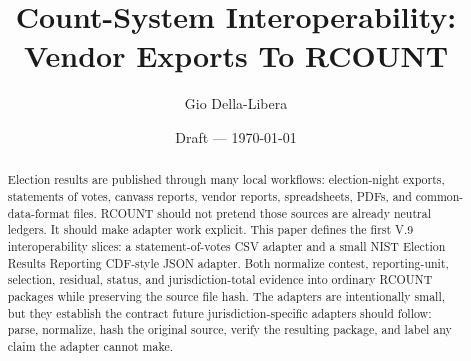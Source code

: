 \documentclass[12pt]{article}
\title{Count-System Interoperability: Vendor Exports To RCOUNT}
\author{Gio Della-Libera}
\date{Draft --- \today}
\begin{document}
\maketitle

\begin{abstract}
Election results are published through many local workflows: election-night
exports, statements of votes, canvass reports, vendor reports, spreadsheets,
PDFs, and common-data-format files. RCOUNT should not pretend those sources are
already neutral ledgers. It should make adapter work explicit. This paper
defines the first V.9 interoperability slices: a statement-of-votes CSV adapter
and a small NIST Election Results Reporting CDF-style JSON adapter. Both
normalize contest, reporting-unit, selection, residual, status, and
jurisdiction-total evidence into ordinary RCOUNT packages while preserving the
source file hash. The adapters are intentionally small, but they establish the
contract future jurisdiction-specific adapters should follow: parse, normalize,
hash the original source, verify the resulting package, and label any claim the
adapter cannot make.
\end{abstract}








\nocite{eac-canvass-certification,nist-election-results-cdf,nist-cdf-guidance,rcount-substrate-2026}


\end{document}
